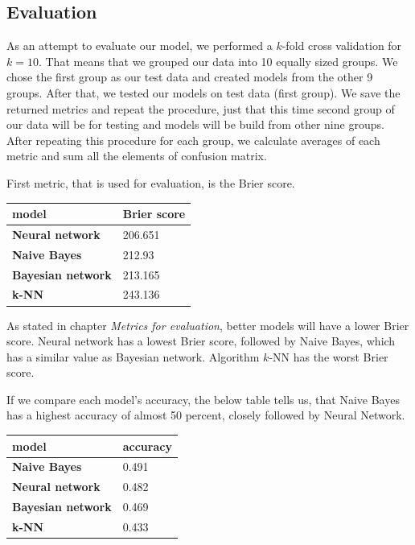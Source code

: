 \documentclass[conference]{IEEEtran}
\begin{document}
\subsection{Evaluation}

As an attempt to evaluate our model, we performed a $k$-fold cross validation
for $k=10$. That means that we grouped our data into 10 equally sized groups. We 
chose the first group as our test data and created models from the other 9 
groups. After that, we tested our models on test data (first group). We save the
returned metrics and repeat the procedure, just that this time second group of our data 
will be for testing and models will be build from other nine groups. After repeating this
procedure for each group, we calculate averages of each metric and sum all the elements
of confusion matrix. 

First metric, that is used for evaluation, is the Brier score. 

\begin{table}[!ht]
    \centering
    \begin{tabular}{ll}
        model & Brier score \\ \hline
        \textbf{Neural network} & 206.651 \\ 
        \textbf{Naive Bayes} & 212.93 \\ 
        \textbf{Bayesian network} & 213.165 \\ 
        \textbf{k-NN} & 243.136 \\ 
    \end{tabular}
\end{table}

As stated in chapter \textit{Metrics for evaluation}, better models will have a lower 
Brier score. Neural network has a lowest Brier score, followed by Naive Bayes, which has 
a similar value as Bayesian network. Algorithm $k$-NN has the worst Brier score.

If we compare each model's accuracy, the below table tells us, that Naive Bayes has a 
highest accuracy of almost 50 percent, closely followed by Neural Network.

\begin{table}[!ht]
    \centering
    \begin{tabular}{ll}
        model & accuracy \\ \hline
        \textbf{Naive Bayes} & 0.491 \\ 
        \textbf{Neural network} & 0.482 \\ 
        \textbf{Bayesian network} & 0.469 \\ 
        \textbf{k-NN} & 0.433 \\ 
    \end{tabular}
\end{table}
\end{document}
